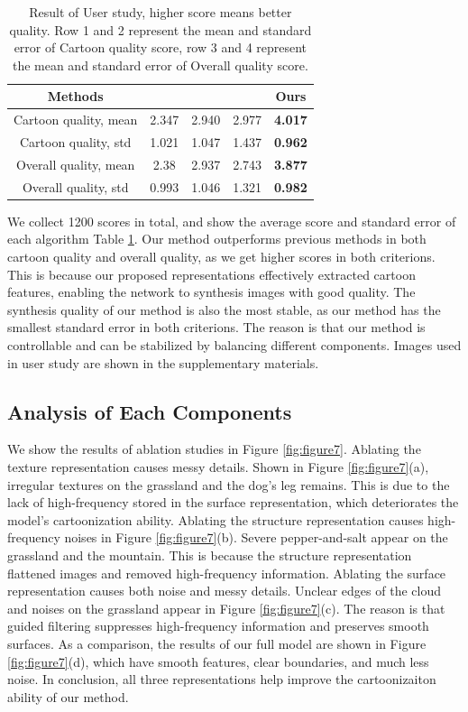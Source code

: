 \documentclass[10pt,twocolumn,letterpaper]{article}
\begin{document}
\begin{table}[t]
\centering
\begin{tabular}{ccccc}
\hline
{Methods}&{\cite{johnson2016perceptual}}&{\cite{chen2018cartoongan}}&{\cite{CycleGAN2017}}&{Ours}\\
\hline  
{Cartoon quality, mean}&{2.347}&{2.940}&{2.977}&{\textbf{4.017}}\\
{Cartoon quality, std}&{1.021}&{1.047}&{1.437}&{\textbf{0.962}}\\
\hline 
{Overall quality, mean}&{2.38}&{2.937}&{2.743}&{\textbf{3.877}}\\
{Overall quality, std}&{0.993}&{1.046}&{1.321}&{\textbf{0.982}}\\
\hline 
\end{tabular}
\caption{Result of User study, higher score means better quality. Row 1 and 2 represent the mean and standard error of Cartoon quality score, row 3 and 4 represent the mean and standard error of Overall quality score.}
\label{table:user_study}
\vspace{-1em}
\end{table}

We collect 1200 scores in total, and show the average score and standard error of each algorithm Table \ref{table:user_study}. Our method outperforms previous methods in both cartoon quality and overall quality, as we get higher scores in both criterions. This is because our proposed representations effectively extracted cartoon features, enabling the network to synthesis images with good quality. The synthesis quality of our method is also the most stable, as our method has the smallest standard error in both criterions. The reason is that our method is controllable and can be stabilized by balancing different components. Images used in user study are shown in the supplementary materials. 
\vspace{-0.3em}
\subsection{Analysis of Each Components}
\vspace{-0.3em}
We show the results of ablation studies in Figure \ref{fig:figure7}. Ablating the texture representation causes messy details. Shown in Figure \ref{fig:figure7}(a), irregular textures on the grassland and the dog's leg remains. This is due to the lack of high-frequency stored in the surface representation, which deteriorates the model's cartoonization ability. Ablating the structure representation causes high-frequency noises in Figure \ref{fig:figure7}(b). Severe pepper-and-salt appear on the grassland and the mountain. This is because the structure representation flattened images and removed high-frequency information. Ablating the surface representation causes both noise and messy details. Unclear edges of the cloud and noises on the grassland appear in Figure \ref{fig:figure7}(c). The reason is that guided filtering suppresses high-frequency information and preserves smooth surfaces. As a comparison, the results of our full model are shown in Figure \ref{fig:figure7}(d), which have smooth features, clear boundaries, and much less noise. In conclusion, all three representations help improve the cartoonizaiton ability of our method.
\vspace{-0.3em}
\end{document}

